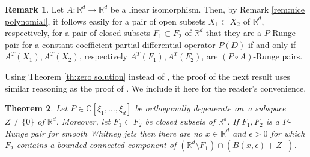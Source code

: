 \documentclass[a4paper,10pt]{amsart}
\newtheorem{theorem}{Theorem}
\newtheorem*{crucial lemma}{Lemma \ref{lem:nice polynomial2}}
\theoremstyle{definition}
\newtheorem{remark}[theorem]{Remark}
\newcommand{\R}{\mathbb{R}}
\newcommand{\C}{\mathbb{C}}
\newcommand{\veryniceon}[1]{orthogonally degenerate on~#1}
\begin{document}
\begin{remark}\label{rem:normal form for Runge pairs for operators with flat charactersistic cone}
	Let $A:\R^d\rightarrow\R^d$ be a linear isomorphism. Then, by Remark \ref{rem:nice polynomial}, it follows easily for a pair of open subsets $X_1\subset X_2$ of $\R^d$, respectively, for a pair of closed subsets $F_1\subset F_2$ of $\R^d$ that they are a $P$-Runge pair for a constant coefficient partial differential operator $P(D)$ if and only if $A^T(X_1), A^T(X_2)$, respectively $A^T(F_1), A^T(F_2)$, are $(P\circ A)$-Runge pairs.  
\end{remark}

Using Theorem \ref{th:zero solution} instead of \cite[Theorem 5]{Kalmes2021}, the proof of the next result uses similar reasoning as the proof of \cite[Theorem 19]{CiasKalmes2025}. We include it here for the reader's convenience.

\begin{theorem}\label{thm: necessary condition for P-Runge for partially elliptic}
	Let $P\in\C[\xi_1,\ldots,\xi_d]$ be \veryniceon{a subspace $Z\neq\{0\}$ of $\R^d$}. Moreover, let $F_1\subset F_2$ be closed subsets of $\R^d$.	If $F_1,F_2$ is a $P$-Runge pair for smooth Whitney jets then there are no $x\in\R^d$ and $\epsilon>0$ for which $F_2$ contains a bounded connected component of $(\R^d\setminus F_1)\cap (B(x,\epsilon)+Z^\perp)$. 
\end{theorem}
\end{document}
